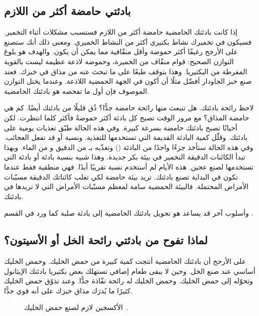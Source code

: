 \subsection{بادئتي حامضة أكثر من اللازم}

إذا كانت بادئتك الحامضية حامضة أكثر من اللازم فستسبب مشكلات أثناء التخمير. فسيكون في تخميرك نشاط بكتيري أكثر من النشاط الخميري. ومعنى ذلك أنك ستصنع على الأرجح رغيفًا أكثر حموضة وأقل منفّافية مما يمكن أن يكون. والهدف هو بلوغ التوازن الصحيح: قوام منفّاف من الخميرة، وحموضة لاذعة عظيمة ليست بالقوية المفرطة من البكتيريا. وهذا يتوقف طبعًا على ما تبحث عنه من مذاق في خبزك. فعند صنع خبز الجاودار أفضّل مثلًا أن أكون في الجهة الحمضية اللاذعة. وعندما يختل التوازن الموصوف فإن أول ما تفحصه هو بادئتك الحامضية.

لاحظ رائحة بادئتك. هل تنبعث منها رائحة حامضة جدًّا؟ ذُق قليلًا من بادئتك أيضًا. كم هي حامضة المذاق؟ مع مرور الوقت تصبح كل بادئة أكثر حموضةً فأكثر كلما انتظرت. لكن أحيانًا تصبح بادئتك حامضة بسرعة كبيرة. وفي هذه الحالة طبّق تغذيات يومية على بادئتك. وقلّل كمية البادئة القديمة التي تستخدمها للتغذية. ونسبة  أو  قد تفعل العجائب. وفي هذه الحالة ستأخذ جزءًا واحدًا من البادئة () وتغذّيه بـ من الدقيق و من الماء. وبهذا تبدأ الكائنات الدقيقة التخمير في بيئة بكر جديدة. وهذا شبيه بنسبة بادئة  أو بادئة  التي تستخدمها لصنع عجين. هذه الأيام لم أستخدم نسبة  تقريبًا أبدًا. فهي منطقية فقط عندما تكون في البداية تصنع بادئتك. تريد بيئة حامضة لكي تغلب كائناتك الدقيقة مسبّبات الأمراض المحتملة. فالبيئة الحمضية سامة لمعظم مسبّبات الأمراض التي لا تريدها في بادئتك.

وأسلوب آخر قد يساعد هو تحويل بادئتك الحامضية إلى بادئة صلبة كما ورد في القسم .

\subsection{لماذا تفوح من بادئتي رائحة الخل أو الأسيتون؟}

على الأرجح أن بادئتك الحامضية أنتجت كمية كبيرة من حمض الخليك. وحمض الخليك أساسي عند صنع الخل. وحين لا يبقى طعام إضافي تستهلك بعض بكتيريا بادئتك الإيثانول وتحوّله إلى حمض الخليك. وحمض الخليك له رائحة نفّاذة جدًّا. وعند تذوّق حمض الخليك كثيرًا ما يُدرَك مذاق خبزك على أنه قوي جدًّا.

\begin{figure}[!htb]
  \centering
  \LR{}
  \caption[صنع حمض الخليك] {الأكسجين لازم لصنع حمض الخليك~\cite{acetic+acid+production}.}%
  \label{fig:ethanol-oxidation}
\end{figure}

